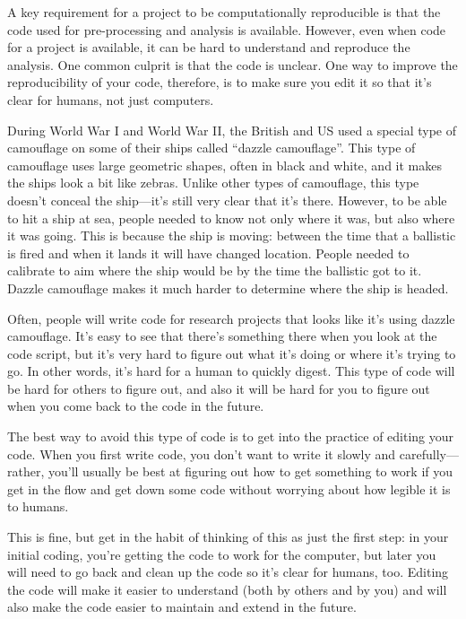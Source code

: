 \documentclass[]{tufte-book}
\begin{document}
A key requirement for a project to be computationally reproducible is that the
code used for pre-processing and analysis is available. However, even when code
for a project is available, it can be hard to understand and reproduce the
analysis. One common culprit is that the code is unclear. One way to improve the
reproducibility of your code, therefore, is to make sure you edit it so that
it's clear for humans, not just computers.

During World War I and World War II, the British and US used a special type of
camouflage on some of their ships called ``dazzle camouflage''. This type of
camouflage uses large geometric shapes, often in black and white, and it makes
the ships look a bit like zebras. Unlike other types of camouflage, this type
doesn't conceal the ship---it's still very clear that it's there. However, to be
able to hit a ship at sea, people needed to know not only where it was, but also
where it was going. This is because the ship is moving: between the time that a
ballistic is fired and when it lands it will have changed location. People
needed to calibrate to aim where the ship would be by the time the ballistic got
to it. Dazzle camouflage makes it much harder to determine where the ship is
headed.

Often, people will write code for research projects that looks like it's using
dazzle camouflage. It's easy to see that there's something there when you look
at the code script, but it's very hard to figure out what it's doing or where
it's trying to go. In other words, it's hard for a human to quickly digest. This
type of code will be hard for others to figure out, and also it will be hard for
you to figure out when you come back to the code in the future.

The best way to avoid this type of code is to get into the practice of editing
your code. When you first write code, you don't want to write it slowly and
carefully---rather, you'll usually be best at figuring out how to get something
to work if you get in the flow and get down some code without worrying about how
legible it is to humans.

This is fine, but get in the habit of thinking of this as just the first step:
in your initial coding, you're getting the code to work for the computer, but
later you will need to go back and clean up the code so it's clear for humans,
too. Editing the code will make it easier to understand (both by others and by
you) and will also make the code easier to maintain and extend in the future.
\end{document}
